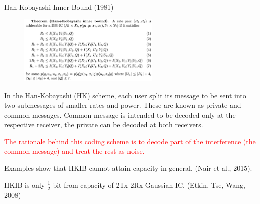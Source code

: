 \documentclass[aspectratio=43, 10pt]{beamer}
\begin{document}
    \begin{frame}{Han-Kobayashi Inner Bound (1981)}
        \vspace{-0.7em}
        \begin{figure}
            \centering
                \includegraphics[width=0.6\textwidth]{figures/HKIB.png}
            \end{figure}

        \vspace{-1em}
        \small 
        \begin{remark}
            In the Han-Kobayashi (HK) scheme, each user split its message to be sent into two submessages of smaller rates and power. These are known as private and common messages. Common message is intended to be decoded only at the respective receiver, the private can be decoded at both receivers. 
            
            \textcolor{red}{The rationale behind this coding scheme is to decode part of the interference (the common message) and treat the rest as noise.}
        \end{remark}

         Examples show that HKIB cannot attain capacity in general. (Nair et al., 2015). 
         
         HKIB is only $\frac{1}{2}$ bit from capacity of 2Tx-2Rx Gaussian IC. (Etkin, Tse, Wang, 2008)
    \end{frame}
\end{document}
